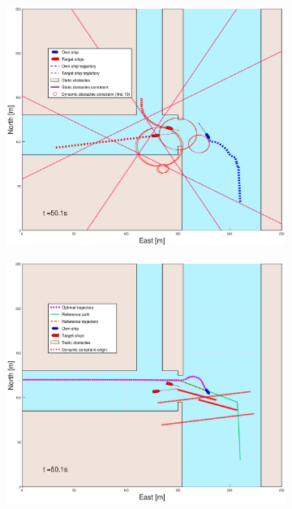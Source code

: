 \begin{figure}[ht]\ContinuedFloat
    \begin{subfigure}[b]{0.49\textwidth}
        \centering
        \includegraphics[width=\textwidth]{Images/Figures/Havn1/_Simple_1fig1_time=50}
    \end{subfigure}
    \hfill
    \begin{subfigure}[b]{0.499\textwidth}
        \centering
        \includegraphics[width=\textwidth]{Images/Figures/Havn1/_Simple_1fig999_time=50}

\end{subfigure}
\end{figure}
